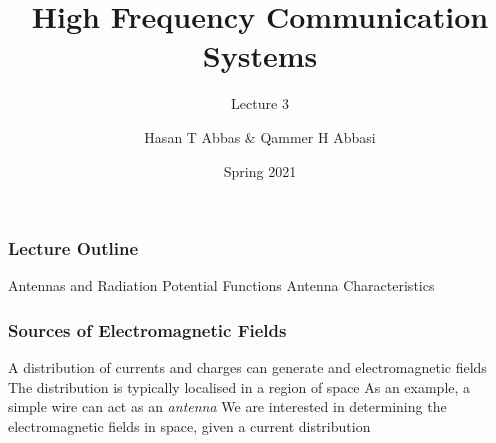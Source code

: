 \documentclass[10pt, compress]{beamer}
\title{High Frequency Communication Systems}
\subtitle{Lecture 3}
\date{Spring 2021}
\author{Hasan T Abbas \& Qammer H Abbasi}
\begin{document}
\maketitle

\begin{frame}[fragile]
  \frametitle{Lecture Outline}
\begin{outline}[itemize]
  \1 Antennas and Radiation
  \1 Potential Functions
  \1 Antenna Characteristics
\end{outline}
\end{frame}
\begin{frame}[fragile]
\frametitle{Sources of Electromagnetic Fields}
\begin{outline}
  \1 A distribution of currents and charges can generate and \color{red}{radiate} electromagnetic fields
    \2 The distribution is typically localised in a region of space
    \2 As an example, a simple wire can act as an \textit{antenna}
  \1 We are interested in determining the electromagnetic fields in space, given a current distribution
\end{outline}
\end{frame}
\end{document}
